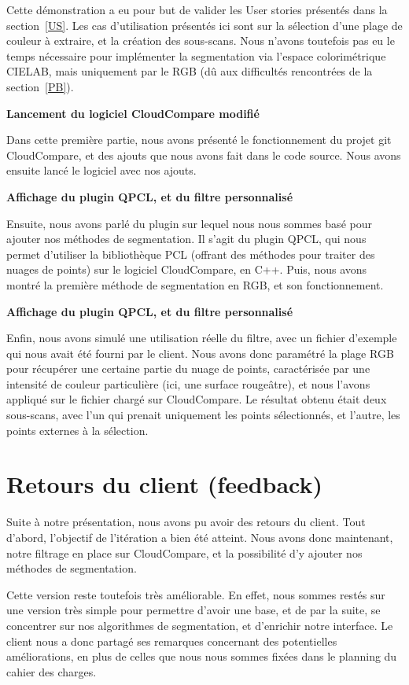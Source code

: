 \documentclass[12pt,titlepage,french]{article}
\begin{document}
Cette démonstration a eu pour but de valider les User stories présentés dans la section~\ref{US}. Les cas d'utilisation présentés ici sont sur la sélection d'une plage de couleur à extraire, et la création des sous-scans. Nous n'avons toutefois pas eu le temps nécessaire pour implémenter la segmentation via l'espace colorimétrique CIELAB, mais uniquement par le RGB (dû aux difficultés rencontrées de la section~\ref{PB}).

\textbf{Lancement du logiciel CloudCompare modifié}

Dans cette première partie, nous avons présenté le fonctionnement du projet git CloudCompare, et des ajouts que nous avons fait dans le code source. Nous avons ensuite lancé le logiciel avec nos ajouts.

\textbf{Affichage du plugin QPCL, et du filtre personnalisé}

Ensuite, nous avons parlé du plugin sur lequel nous nous sommes basé pour ajouter nos méthodes de segmentation. Il s'agit du plugin QPCL, qui nous permet d'utiliser la bibliothèque PCL (offrant des méthodes pour traiter des nuages de points) sur le logiciel CloudCompare, en C++. Puis, nous avons montré la première méthode de segmentation en RGB, et son fonctionnement.

\textbf{Affichage du plugin QPCL, et du filtre personnalisé}

Enfin, nous avons simulé une utilisation réelle du filtre, avec un fichier d'exemple qui nous avait été fourni par le client. Nous avons donc paramétré la plage RGB pour récupérer une certaine partie du nuage de points, caractérisée par une intensité de couleur particulière (ici, une surface rougeâtre), et nous l'avons appliqué sur le fichier chargé sur CloudCompare. Le résultat obtenu était deux sous-scans, avec l'un qui prenait uniquement les points sélectionnés, et l'autre, les points externes à la sélection.

\section{Retours du client (feedback)}

Suite à notre présentation, nous avons pu avoir des retours du client. Tout d'abord, l'objectif de l'itération a bien été atteint. Nous avons donc maintenant, notre filtrage en place sur CloudCompare, et la possibilité d'y ajouter nos méthodes de segmentation.

Cette version reste toutefois très améliorable. En effet, nous sommes restés sur une version très simple pour permettre d'avoir une base, et de par la suite, se concentrer sur nos algorithmes de segmentation, et d'enrichir notre interface. Le client nous a donc partagé ses remarques concernant des potentielles améliorations, en plus de celles que nous nous sommes fixées dans le planning du cahier des charges.
\end{document}
